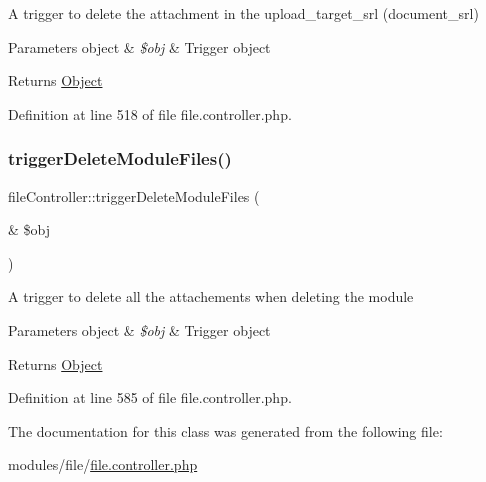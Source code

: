 A trigger to delete the attachment in the upload\+\_\+target\+\_\+srl (document\+\_\+srl)


\begin{DoxyParams}[1]{Parameters}
object & {\em \$obj} & Trigger object \\
\hline
\end{DoxyParams}
\begin{DoxyReturn}{Returns}
\hyperlink{classObject}{Object} 
\end{DoxyReturn}


Definition at line 518 of file file.\+controller.\+php.

\mbox{\label{classfileController_a68fbf2cdcb182912d4138f269904a1ba}} 
\subsubsection{\texorpdfstring{trigger\+Delete\+Module\+Files()}{triggerDeleteModuleFiles()}}
{\footnotesize\ttfamily file\+Controller\+::trigger\+Delete\+Module\+Files (\begin{DoxyParamCaption}\item[{\&}]{\$obj }\end{DoxyParamCaption})}

A trigger to delete all the attachements when deleting the module


\begin{DoxyParams}[1]{Parameters}
object & {\em \$obj} & Trigger object \\
\hline
\end{DoxyParams}
\begin{DoxyReturn}{Returns}
\hyperlink{classObject}{Object} 
\end{DoxyReturn}


Definition at line 585 of file file.\+controller.\+php.



The documentation for this class was generated from the following file\+:\begin{DoxyCompactItemize}
\item 
modules/file/\hyperlink{file_8controller_8php}{file.\+controller.\+php}\end{DoxyCompactItemize}
